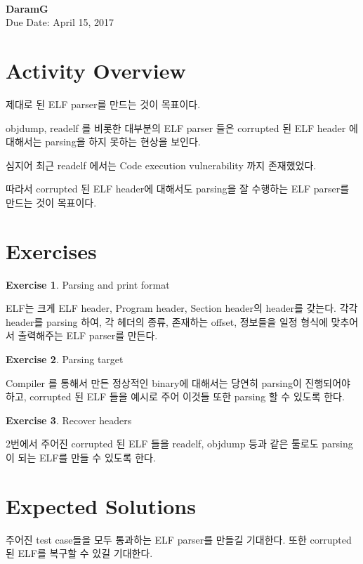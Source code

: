 \documentclass[a4paper, 11pt]{article}
\theoremstyle{definition}
\newtheorem{exercise}{Exercise}
\begin{document}
 \\
         {\phantom{} \hfill \textbf{DaramG}} \\
         {\phantom{} \hfill Due Date: April 15, 2017} \\

\section{Activity Overview}

제대로 된 ELF parser를 만드는 것이 목표이다.

objdump, readelf 를 비롯한 대부분의 ELF parser 들은 corrupted 된 ELF header 에 대해서는 parsing을 하지 못하는 현상을 보인다.

심지어 최근 readelf 에서는 Code execution vulnerability 까지 존재했었다.

따라서 corrupted 된 ELF header에 대해서도 parsing을 잘 수행하는 ELF parser를 만드는 것이 목표이다.

\section{Exercises}

\begin{exercise} Parsing and print format


  ELF는 크게 ELF header, Program header, Section header의 header를 갖는다.
  각각 header를 parsing 하여, 각 헤더의 종류, 존재하는 offset, 정보들을 일정 형식에 맞추어서 출력해주는
  ELF parser를 만든다.

\end{exercise}

\begin{exercise} Parsing target

  Compiler 를 통해서 만든 정상적인 binary에 대해서는 당연히 parsing이 진행되어야 하고,
  corrupted 된 ELF 들을 예시로 주어 이것들 또한 parsing 할 수 있도록 한다.

\end{exercise}

\begin{exercise}  Recover headers

  2번에서 주어진 corrupted 된 ELF 들을 readelf, objdump 등과 같은 툴로도 parsing이 되는
  ELF를 만들 수 있도록 한다.

\end{exercise}

\section{Expected Solutions}

주어진 test case들을 모두 통과하는 ELF parser를 만들길 기대한다.
또한 corrupted 된 ELF를 복구할 수 있길 기대한다.



\end{document}
